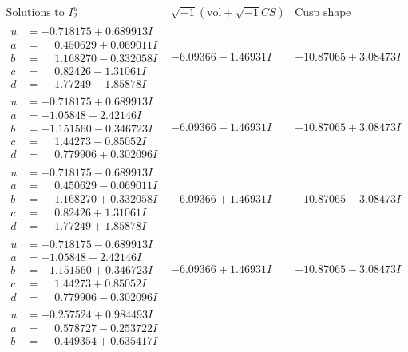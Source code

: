 \documentclass[1p]{elsarticle_modified}
\theoremstyle{definition}
\newcommand{\I}{\sqrt{-1}}
\begin{document}
$$\begin{array}{c|c|c}  
\text{Solutions to }I^u_{2}& \I (\text{vol} + \sqrt{-1}CS) & \text{Cusp shape}\\
 \hline 
\begin{aligned}
u &= -0.718175 + 0.689913 I \\
a &= \phantom{-}0.450629 + 0.069011 I \\
b &= \phantom{-}1.168270 - 0.332058 I \\
c &= \phantom{-}0.82426 - 1.31061 I \\
d &= \phantom{-}1.77249 - 1.85878 I\end{aligned}
 & -6.09366 - 1.46931 I & -10.87065 + 3.08473 I \\ \hline\begin{aligned}
u &= -0.718175 + 0.689913 I \\
a &= -1.05848 + 2.42146 I \\
b &= -1.151560 - 0.346723 I \\
c &= \phantom{-}1.44273 - 0.85052 I \\
d &= \phantom{-}0.779906 + 0.302096 I\end{aligned}
 & -6.09366 - 1.46931 I & -10.87065 + 3.08473 I \\ \hline\begin{aligned}
u &= -0.718175 - 0.689913 I \\
a &= \phantom{-}0.450629 - 0.069011 I \\
b &= \phantom{-}1.168270 + 0.332058 I \\
c &= \phantom{-}0.82426 + 1.31061 I \\
d &= \phantom{-}1.77249 + 1.85878 I\end{aligned}
 & -6.09366 + 1.46931 I & -10.87065 - 3.08473 I \\ \hline\begin{aligned}
u &= -0.718175 - 0.689913 I \\
a &= -1.05848 - 2.42146 I \\
b &= -1.151560 + 0.346723 I \\
c &= \phantom{-}1.44273 + 0.85052 I \\
d &= \phantom{-}0.779906 - 0.302096 I\end{aligned}
 & -6.09366 + 1.46931 I & -10.87065 - 3.08473 I \\ \hline\begin{aligned}
u &= -0.257524 + 0.984493 I \\
a &= \phantom{-}0.578727 - 0.253722 I \\
b &= \phantom{-}0.449354 + 0.635417 I \\

\end{aligned}
\end{array}$$
\end{document}
